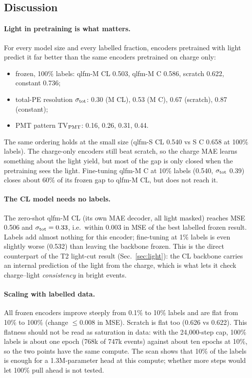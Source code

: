\subsection{Discussion}
\paragraph{Light in pretraining is what matters.} For every model size and every labelled fraction, encoders pretrained with light predict it far better than the same encoders pretrained on charge only:
\begin{itemize}
  \item frozen, 100\% labels: qlfm-M CL 0.503, qlfm-M C 0.586, scratch 0.622, constant 0.736;
  \item total-PE resolution $\sigma_{\rm tot}$: 0.30 (M CL), 0.53 (M C), 0.67 (scratch), 0.87 (constant);
  \item PMT pattern TV$_{\rm PMT}$: 0.16, 0.26, 0.31, 0.44.
\end{itemize}
The same ordering holds at the small size (qlfm-S CL 0.540 vs S C 0.658 at 100\% labels). The charge-only encoders still beat scratch, so the charge MAE learns something about the light yield, but most of the gap is only closed when the pretraining sees the light. Fine-tuning qlfm-M C at 10\% labels (0.540, $\sigma_{\rm tot}$ 0.39) closes about 60\% of its frozen gap to qlfm-M CL, but does not reach it.

\paragraph{The CL model needs no labels.} The zero-shot qlfm-M CL (its own MAE decoder, all light masked) reaches MSE 0.506 and $\sigma_{\rm tot}=0.33$, i.e.\ within 0.003 in MSE of the best labelled frozen result. Labels add almost nothing for this encoder; fine-tuning at 1\% labels is even slightly worse (0.532) than leaving the backbone frozen. This is the direct counterpart of the T2 light-cut result (Sec.~\ref{sec:light}): the CL backbone carries an internal prediction of the light from the charge, which is what lets it check charge--light \emph{consistency} in bright events.

\paragraph{Scaling with labelled data.} All frozen encoders improve steeply from 0.1\% to 10\% labels and are flat from 10\% to 100\% (change $\leq$0.008 in MSE). Scratch is flat too (0.626 vs 0.622). This flatness should not be read as saturation in data: with the 24{,}000-step cap, 100\% labels is about one epoch (768k of 747k events) against about ten epochs at 10\%, so the two points have the same compute. The scan shows that 10\% of the labels is enough for a 1.3M-parameter head at this compute; whether more steps would let 100\% pull ahead is not tested.

